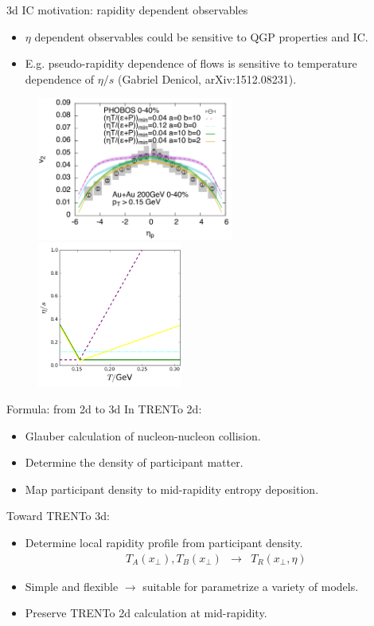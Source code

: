 \documentclass[11pt]{beamer}
\begin{document}
\begin{frame}{3d IC motivation: rapidity dependent observables}
\begin{itemize}
\item $\eta$ dependent observables could be sensitive to QGP properties and IC.
\item E.g. pseudo-rapidity dependence of flows is sensitive to temperature dependence of $\eta/s$ (Gabriel Denicol, arXiv:1512.08231).
\end{itemize}
\begin{center}
\begin{figure}
\includegraphics[width=0.575\textwidth]{./pics/Bjorn-v2-eta.png}
\includegraphics[width=0.425\textwidth]{./pics/etaS-Bjorn.png}
\end{figure}
\end{center}
\end{frame}

\begin{frame}{Formula: from 2d to 3d}
In TRENTo 2d:
\begin{itemize}
\item Glauber calculation of nucleon-nucleon collision.
\item Determine the density of participant matter.
\item Map participant density to mid-rapidity entropy deposition.
\end{itemize}
Toward TRENTo 3d:
\begin{itemize}
\item \color{red} Determine local rapidity profile from participant density.
\begin{eqnarray}
	T_A(x_\perp), T_B(x_\perp) &\rightarrow& T_R(x_\perp, \eta)
\end{eqnarray}
\item Simple and flexible $\rightarrow$ suitable for parametrize a variety of models.
\item Preserve TRENTo 2d calculation at mid-rapidity.
\end{itemize}
\end{frame}
\end{document}
